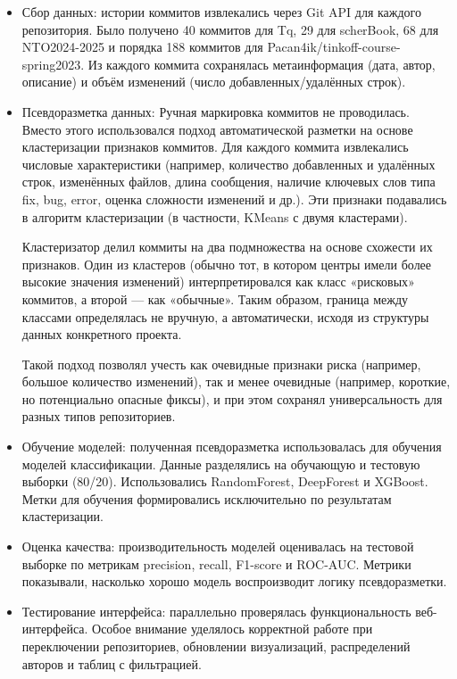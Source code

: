 \begin{itemize}
\item Сбор данных: истории коммитов извлекались через Git API для каждого репозитория. Было получено 40 коммитов для Tq, 29 для scherBook, 68 для NTO2024-2025 и порядка 188 коммитов для Pacan4ik/tinkoff-course-spring2023. Из каждого коммита сохранялась метаинформация (дата, автор, описание) и объём изменений (число добавленных/удалённых строк).
\item Псевдоразметка данных: Ручная маркировка коммитов не проводилась. Вместо этого использовался подход автоматической разметки на основе кластеризации признаков коммитов. Для каждого коммита извлекались числовые характеристики (например, количество добавленных и удалённых строк, изменённых файлов, длина сообщения, наличие ключевых слов типа fix, bug, error, оценка сложности изменений и др.). Эти признаки подавались в алгоритм кластеризации (в частности, KMeans с двумя кластерами).

Кластеризатор делил коммиты на два подмножества на основе схожести их признаков. Один из кластеров (обычно тот, в котором центры имели более высокие значения изменений) интерпретировался как класс «рисковых» коммитов, а второй — как «обычные». Таким образом, граница между классами определялась не вручную, а автоматически, исходя из структуры данных конкретного проекта.

Такой подход позволял учесть как очевидные признаки риска (например, большое количество изменений), так и менее очевидные (например, короткие, но потенциально опасные фиксы), и при этом сохранял универсальность для разных типов репозиториев.

\item Обучение моделей: полученная псевдоразметка использовалась для обучения моделей классификации. Данные разделялись на обучающую и тестовую выборки (80/20). Использовались RandomForest, DeepForest и XGBoost. Метки для обучения формировались исключительно по результатам кластеризации.
\item Оценка качества: производительность моделей оценивалась на тестовой выборке по метрикам precision, recall, F1-score и ROC-AUC. Метрики показывали, насколько хорошо модель воспроизводит логику псевдоразметки.
\item Тестирование интерфейса: параллельно проверялась функциональность веб-интерфейса. Особое внимание уделялось корректной работе при переключении репозиториев, обновлении визуализаций, распределений авторов и таблиц с фильтрацией.
\end{itemize}

